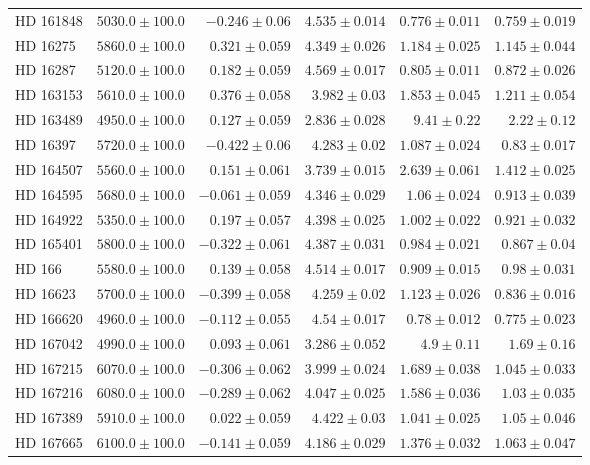\begin{longtable*}{lrrrrr}
HD 161848 & $5030.0\pm 100.0$ & $-0.246\pm 0.06$ & $4.535\pm 0.014$ & $0.776\pm 0.011$ & $0.759\pm 0.019$ \\ 
HD 16275 & $5860.0\pm 100.0$ & $0.321\pm 0.059$ & $4.349\pm 0.026$ & $1.184\pm 0.025$ & $1.145\pm 0.044$ \\ 
HD 16287 & $5120.0\pm 100.0$ & $0.182\pm 0.059$ & $4.569\pm 0.017$ & $0.805\pm 0.011$ & $0.872\pm 0.026$ \\ 
HD 163153 & $5610.0\pm 100.0$ & $0.376\pm 0.058$ & $3.982\pm 0.03$ & $1.853\pm 0.045$ & $1.211\pm 0.054$ \\ 
HD 163489 & $4950.0\pm 100.0$ & $0.127\pm 0.059$ & $2.836\pm 0.028$ & $9.41\pm 0.22$ & $2.22\pm 0.12$ \\ 
HD 16397 & $5720.0\pm 100.0$ & $-0.422\pm 0.06$ & $4.283\pm 0.02$ & $1.087\pm 0.024$ & $0.83\pm 0.017$ \\ 
HD 164507 & $5560.0\pm 100.0$ & $0.151\pm 0.061$ & $3.739\pm 0.015$ & $2.639\pm 0.061$ & $1.412\pm 0.025$ \\ 
HD 164595 & $5680.0\pm 100.0$ & $-0.061\pm 0.059$ & $4.346\pm 0.029$ & $1.06\pm 0.024$ & $0.913\pm 0.039$ \\ 
HD 164922 & $5350.0\pm 100.0$ & $0.197\pm 0.057$ & $4.398\pm 0.025$ & $1.002\pm 0.022$ & $0.921\pm 0.032$ \\ 
HD 165401 & $5800.0\pm 100.0$ & $-0.322\pm 0.061$ & $4.387\pm 0.031$ & $0.984\pm 0.021$ & $0.867\pm 0.04$ \\ 
HD 166 & $5580.0\pm 100.0$ & $0.139\pm 0.058$ & $4.514\pm 0.017$ & $0.909\pm 0.015$ & $0.98\pm 0.031$ \\ 
HD 16623 & $5700.0\pm 100.0$ & $-0.399\pm 0.058$ & $4.259\pm 0.02$ & $1.123\pm 0.026$ & $0.836\pm 0.016$ \\ 
HD 166620 & $4960.0\pm 100.0$ & $-0.112\pm 0.055$ & $4.54\pm 0.017$ & $0.78\pm 0.012$ & $0.775\pm 0.023$ \\ 
HD 167042 & $4990.0\pm 100.0$ & $0.093\pm 0.061$ & $3.286\pm 0.052$ & $4.9\pm 0.11$ & $1.69\pm 0.16$ \\ 
HD 167215 & $6070.0\pm 100.0$ & $-0.306\pm 0.062$ & $3.999\pm 0.024$ & $1.689\pm 0.038$ & $1.045\pm 0.033$ \\ 
HD 167216 & $6080.0\pm 100.0$ & $-0.289\pm 0.062$ & $4.047\pm 0.025$ & $1.586\pm 0.036$ & $1.03\pm 0.035$ \\ 
HD 167389 & $5910.0\pm 100.0$ & $0.022\pm 0.059$ & $4.422\pm 0.03$ & $1.041\pm 0.025$ & $1.05\pm 0.046$ \\ 
HD 167665 & $6100.0\pm 100.0$ & $-0.141\pm 0.059$ & $4.186\pm 0.029$ & $1.376\pm 0.032$ & $1.063\pm 0.047$ \\ 

\end{longtable*}
